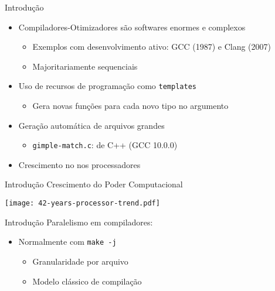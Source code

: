 \begin{frame}{Introdução}
  \begin{itemize}
    \item Compiladores-Otimizadores são softwares enormes e complexos
        \begin{itemize}
            \item Exemplos com desenvolvimento ativo: GCC (1987) e Clang (2007)
            \item Majoritariamente sequenciais
        \end{itemize}
    \item Uso de recursos de programação como \texttt{templates}
        \begin{itemize}
           \item Gera novas funções para cada novo tipo no argumento
        \end{itemize}
    \item Geração automática de arquivos grandes
        \begin{itemize}
            \item \texttt{gimple-match.c}: {\color{red}{100358 linhas}} de C++ (GCC 10.0.0)
        \end{itemize}
    \item Crescimento {\color{red}{exponencial}} no {\color{blue}{número de núcleos}} nos processadores
  \end{itemize}
\end{frame}

\begin{frame}{Introdução}
    Crescimento do Poder Computacional \citep{42years}

    \centering
    \texttt{[image: 42-years-processor-trend.pdf]}
    \label{fig:42years}
\end{frame}

\begin{frame}{Introdução}
    Paralelismo em compiladores:
    \begin{itemize}
        \item Normalmente com \texttt{make -j}
            \begin{itemize}
                \item Granularidade por arquivo
                \item Modelo clássico de compilação
            \end{itemize}
    \end{itemize}
\end{frame}

